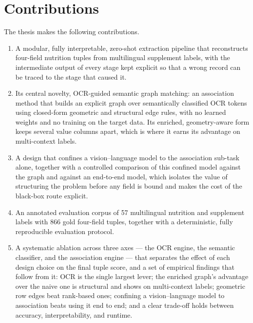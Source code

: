 \section{Contributions}\label{sec:intro-contributions}

The thesis makes the following contributions.
\begin{enumerate}
  \item A modular, fully interpretable, zero-shot extraction pipeline that
        reconstructs four-field nutrition tuples from multilingual supplement
        labels, with the intermediate output of every stage kept explicit so that
        a wrong record can be traced to the stage that caused it.

  \item Its central novelty, OCR-guided semantic graph matching: an association
        method that builds an explicit graph over semantically classified OCR
        tokens using closed-form geometric and structural edge rules, with no
        learned weights and no training on the target data. Its enriched,
        geometry-aware form keeps several value columns apart, which is where it
        earns its advantage on multi-context labels.

  \item A design that confines a vision--language model to the association
        sub-task alone, together with a controlled comparison of this confined
        model against the graph and against an end-to-end model, which isolates
        the value of structuring the problem before any field is bound and makes
        the cost of the black-box route explicit.

  \item An annotated evaluation corpus of 57 multilingual nutrition and supplement
        labels with 866 gold four-field tuples, together with a deterministic,
        fully reproducible evaluation protocol.

  \item A systematic ablation across three axes --- the OCR engine, the semantic
        classifier, and the association engine --- that separates the effect of
        each design choice on the final tuple score, and a set of empirical
        findings that follow from it: OCR is the single largest lever; the
        enriched graph's advantage over the naive one is structural and shows on
        multi-context labels; geometric row edges beat rank-based ones; confining
        a vision--language model to association beats using it end to end; and a
        clear trade-off holds between accuracy, interpretability, and runtime.
\end{enumerate}

